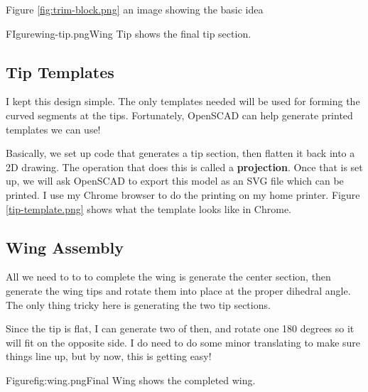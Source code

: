 Figure \ref{fig:trim-block.png}  an image showing the basic idea



FIgure{wing-tip.png}{Wing Tip} shows the final tip section.


\subsection{Tip Templates}

I kept this design simple. The only templates needed will be used for forming
the curved segments at the tips. Fortunately, OpenSCAD can help generate
printed templates we can use!

Basically, we set up code that generates a tip section, then flatten it back
into a 2D drawing. The operation that does this is called a {\bf projection}.
Once that is set up, we will ask OpenSCAD to export this model as an SVG file
which can be printed. I use my Chrome browser to do the printing on my home
printer.  Figure \ref{tip-template.png} shows what the template looks like in
Chrome.


\subsection{Wing Assembly}

All we need to to to complete the wing is generate the center section, then generate the wing tips and rotate them into place at the proper dihedral angle. The only thing tricky here is generating the two tip sections.

Since the tip is flat, I can generate two of then, and rotate one 180 degrees so it will fit on the opposite side. I do need to do some minor translating to make sure things line up, but by now, this is getting easy!

Figure{fig:wing.png}{Final Wing} shows the completed wing.

